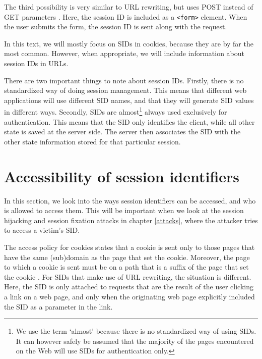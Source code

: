 The third possibility is very similar to URL rewriting, but uses POST instead of GET parameters \cite{Johns2006}. Here, the session ID is included as a \texttt{<form>} element. When the user submits the form, the session ID is sent along with the request.

In this text, we will mostly focus on SIDs in cookies, because they are by far the most common. However, when appropriate, we will include information about session IDs in URLs.

There are two important things to note about session IDs. Firstly, there is no standardized way of doing session management. This means that different web applications will use different SID names, and that they will generate SID values in different ways. Secondly, SIDs are almost\footnote{We use the term `almost' because there is no standardized way of using SIDs. It can however safely be assumed that the majority of the pages encountered on the Web will use SIDs for authentication only.} always used exclusively for authentication. This means that the SID only identifies the client, while all other state is saved at the server side. The server then associates the SID with the other state information stored for that particular session.

\section{Accessibility of session identifiers}

In this section, we look into the ways session identifiers can be accessed, and who is allowed to access them. This will be important when we look at the \gls{session hijacking} and \gls{session fixation} attacks in chapter \ref{attacks}, where the attacker tries to access a victim's SID.

\label{access-control}The access policy for cookies states that a cookie is sent only to those pages that have the same (sub)domain as the page that set the cookie. Moreover, the page to which a cookie is sent must be on a path that is a suffix of the page that set the cookie \cite{Singh2010}. For SIDs that make use of URL rewriting, the situation is different. Here, the SID is only attached to requests that are the result of the user clicking a link on a web page, and only when the originating web page explicitly included the SID as a parameter in the link.


